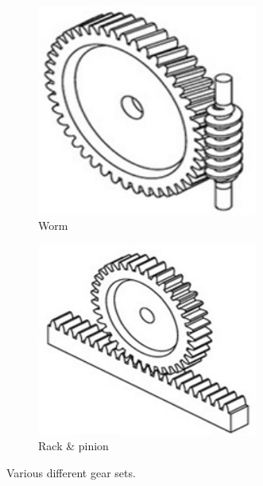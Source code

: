 \documentclass[10pt,letterpaper]{book}
\begin{document}
\begin{figure}[H]
	\begin{subfigure}[b]{.32\linewidth}
		\includegraphics[width=0.8\textwidth]{imgs/gear_worm.png}
		\caption{Worm}
	\end{subfigure}\begin{subfigure}[b]{.32\linewidth}
		\includegraphics[width=0.8\textwidth]{imgs/gear_rack_pinion.png}
		\caption{Rack \& pinion}
	\end{subfigure}
	\caption{Various different gear sets.}
\end{figure}
\end{document}
